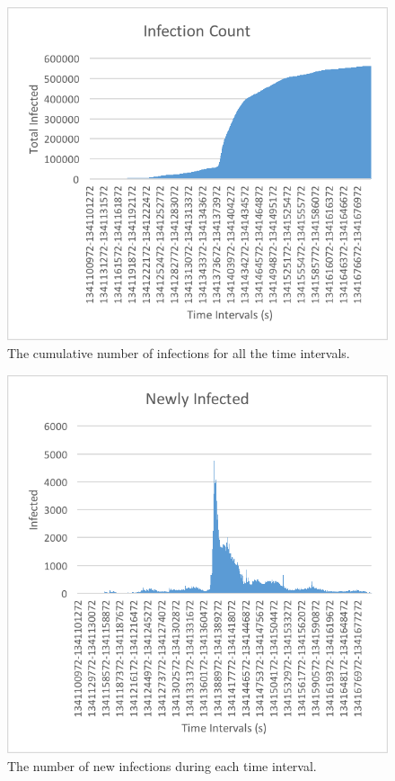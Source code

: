 \documentclass[12pt, oneside, openany]{article} %
\begin{document}
\begin{figure}
\centering
    \includegraphics{infection-count.png}
    \caption{The cumulative number of infections for all the time intervals.}
    \label{fig:infection-count}
\end{figure}

\begin{figure}
\centering
    \includegraphics{newly-infected.png}
    \caption{The number of new infections during each time interval.}
    \label{fig:newly-infected}
\end{figure}
\end{document}
